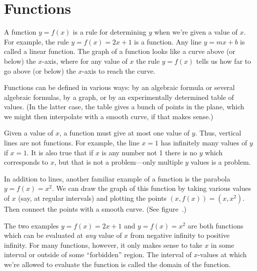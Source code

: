 \section{Functions}{}{}

A {\dfont function} $y=f(x)$ is a rule for determining
$y$ when we're given a value of $x$.  For example, the rule
$y=f(x)=2x+1$ is a function.  Any line $y=mx+b$ is called a {\dfont
linear} function.  The graph of a function
looks like a curve above (or below) the $x$-axis, where for any value
of $x$ the rule $y=f(x)$ tells us how far to go above (or below) the
$x$-axis to reach the curve.

Functions can be defined in various ways: by an algebraic formula or several
algebraic formulas, by
a graph, or by an experimentally determined table of values.  (In the latter
case, the table gives a bunch of points in the plane, which we might then
interpolate with a smooth curve, if that makes sense.)

Given a value of $x$, a function must give
at most one value of $y$.  Thus, vertical lines are not functions.  For
example, the line $x=1$ has infinitely many values of $y$ if $x=1$. It
is also true that 
if $x$ is any number not 1 there is no $y$ which corresponds to $x$,
but that is not a problem---only multiple $y$ values is a problem.

In addition to lines, another familiar example of a  
function is the parabola $y=f(x)=x^2$.  We can draw the graph of this
function by taking various values of $x$ (say, at regular intervals) and
plotting the points $(x,f(x))=(x,x^2)$.  Then connect the points with a
smooth curve.  (See figure~.)

The two examples $y=f(x)=2x+1$ and $y=f(x)=x^2$ are both functions which
can be evaluated at {\em any} value of $x$ from negative infinity to
positive infinity.  For many functions, however, it only makes sense to
take $x$ in some interval or outside of some ``forbidden'' region.  The
interval of $x$-values at which we're allowed to evaluate the function is
called the {\dfont domain} of the function.

